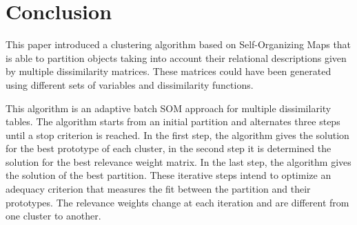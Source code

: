 \documentclass[10pt, conference, compsocconf]{IEEEtran}
\begin{document}
%



\section{Conclusion}\label{sec:conclusion}
This paper introduced a clustering algorithm based on Self-Organizing Maps that is able to partition objects taking into account their relational descriptions given by multiple dissimilarity matrices. These matrices could have been generated using different sets of variables and dissimilarity functions. 

This algorithm is an adaptive batch SOM approach for multiple dissimilarity tables. The algorithm starts from an initial partition and alternates three steps until a stop criterion is reached. In the first step, the algorithm gives the solution for the best prototype of each cluster, in the second step it is determined the solution for the best relevance weight matrix. In the last step, the algorithm gives the solution of the best partition. These iterative steps intend to optimize an adequacy criterion that measures the fit between the partition and their prototypes. The relevance weights change at each iteration and are different from one cluster to another. 
\end{document}
